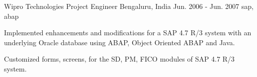 \cventry
    {Wipro Technologies} %
    {Project Engineer} %
    {Bengaluru, India} %
    {Jun. 2006 - Jun. 2007} %
    { sap, abap } %
    {
        \vspace{-4.0mm}
    \begin{cvitems} %
        \item { Implemented enhancements and modifications for a SAP 4.7 R/3 system with an underlying Oracle database using ABAP, Object Oriented ABAP and Java.}
        \item { Customized forms, screens, for the SD, PM, FICO modules of SAP 4.7 R/3 system.}
    \end{cvitems}
    }